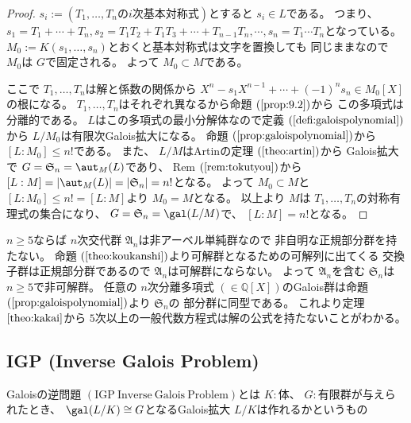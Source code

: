 \documentclass[../master_galois_theory]{subfiles}
\begin{document}
\begin{proof}
  $s_i := (T_1 , \dots , T_n の i次基本対称式)$とすると $s_i \in L$である。
  つまり、 $s_1 = T_1 + \cdots + T_n , s_2 = T_1 T_2 + T_1 T_3 + \cdots + T_{n-1} T_n , \cdots , s_n = T_1 \cdots T_n$となっている。
  $M_0 := K(s_1 , \dots , s_n)$とおくと基本対称式は文字を置換しても
  同じままなので $M_0$は $G$で固定される。
  よって $M_0 \subset M$である。

  ここで $T_1 , \dots , T_n$は解と係数の関係から
  $X^n - s_1 X^{n-1} + \cdots + (-1)^n s_n \in M_0[X]$の根になる。
  $T_1 , \dots , T_n$はそれぞれ異なるから命題 $(\mathrm{\ref{prop:9.2}})$から
  この多項式は分離的である。
  $L$はこの多項式の最小分解体なので定義 $(\mathrm{\ref{defi:galoispolynomial}})$
  から $L/M_0$は有限次\rm{Galois}拡大になる。
  命題 $(\mathrm{\ref{prop:galoispolynomial}})$から
  $[L:M_0] \leq n!$である。
  また、 $L/M$は\rm{Artin}の定理 $(\mathrm{\ref{theo:artin}})$から
  \rm{Galois}拡大で $G = \mathfrak{S}_n = \aut_M(L)$であり、
  \rm{Rem} $(\mathrm{\ref{rem:tokutyou}})$から $[L:M] = |\aut_M(L)| = |\mathfrak{S}_n| = n!$となる。
  よって $M_0 \subset M$と $[L:M_0] \leq n! = [L:M]$より $M_0 = M$となる。
  以上より $M$は $T_1 , \dots , T_n$の対称有理式の集合になり、
  $G = \mathfrak{S}_n = \gal(L/M)$で、 $[L:M] = n!$となる。
\end{proof}

\begin{fact}
  $n \geq 5$ならば $n$次交代群 $\mathfrak{A}_n$は非アーベル単純群なので
  非自明な正規部分群を持たない。
  命題 $(\mathrm{\ref{theo:koukanshi}})$より可解群となるための可解列に出てくる
  交換子群は正規部分群であるので $\mathfrak{A}_n$は可解群にならない。
  よって $\mathfrak{A}_n$を含む $\mathfrak{S}_n$は $n \geq 5$で非可解群。
  任意の $n$次分離多項式 $(\in \mathbb{Q}[X])$の\rm{Galois}群は命題 $(\mathrm{\ref{prop:galoispolynomial}})$より $\mathfrak{S}_n$の
  部分群に同型である。
  これより定理 $\mathrm{\ref{theo:kakai}}$から
  $5$次以上の一般代数方程式は解の公式を持たないことがわかる。
\end{fact}

\subsection{IGP (Inverse Galois Problem)}

  \rm{Galois}の逆問題 $(\mathrm{IGP \  Inverse \  Galois \  Problem})$とは
  $K:$体、 $G:$有限群が与えられたとき、
  $\gal(L/K) \cong G$となる\rm{Galois}拡大 $L/K$は作れるかというもの
\end{document}
